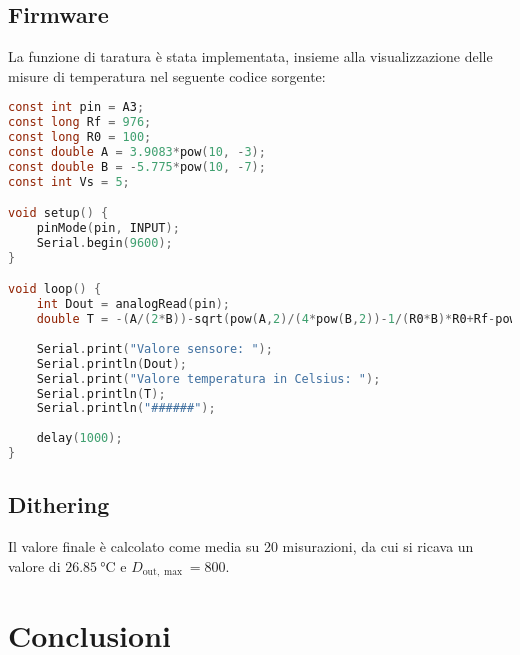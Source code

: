 \documentclass{article}
\begin{document}
\subsection{Firmware}
La funzione di taratura è stata implementata, insieme alla visualizzazione delle misure di temperatura nel seguente codice sorgente:
\begin{lstlisting}[language=C]
const int pin = A3;
const long Rf = 976;
const long R0 = 100;
const double A = 3.9083*pow(10, -3);
const double B = -5.775*pow(10, -7);
const int Vs = 5;

void setup() {
    pinMode(pin, INPUT);
    Serial.begin(9600);
}

void loop() {
    int Dout = analogRead(pin); 
    double T = -(A/(2*B))-sqrt(pow(A,2)/(4*pow(B,2))-1/(R0*B)*R0+Rf-pow(2, 10)/Dout*Rf);
    
    Serial.print("Valore sensore: ");
    Serial.println(Dout);
    Serial.print("Valore temperatura in Celsius: ");
    Serial.println(T);  
    Serial.println("######");
    
    delay(1000);
}
\end{lstlisting}
\subsection{Dithering}
Il valore finale è calcolato come media su 20 misurazioni, da cui si ricava un valore di $\SI{26.85}{\celsius}$ e $D_{\text{out}, \max}=800$.
\section{Conclusioni}
\end{document}
